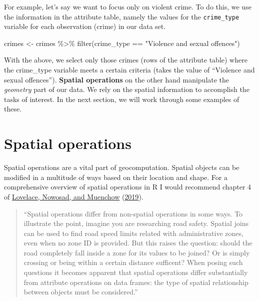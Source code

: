 \documentclass[
]{book}
\newenvironment{Shaded}{\begin{snugshade}}{\end{snugshade}}
\newcommand{\FunctionTok}[1]{\textcolor[rgb]{0.00,0.00,0.00}{#1}}
\newcommand{\NormalTok}[1]{#1}
\newcommand{\OtherTok}[1]{\textcolor[rgb]{0.56,0.35,0.01}{#1}}
\newcommand{\SpecialCharTok}[1]{\textcolor[rgb]{0.00,0.00,0.00}{#1}}
\newcommand{\StringTok}[1]{\textcolor[rgb]{0.31,0.60,0.02}{#1}}
\begin{document}
For example, let's say we want to focus only on violent crime. To do this, we use the information in the attribute table, namely the values for the \texttt{crime\_type} variable for each observation (crime) in our data set.

\begin{Shaded}
\begin{Highlighting}[]
\NormalTok{crimes }\OtherTok{\textless{}{-}}\NormalTok{ crimes }\SpecialCharTok{\%\textgreater{}\%} \FunctionTok{filter}\NormalTok{(crime\_type }\SpecialCharTok{==} \StringTok{"Violence and sexual offences"}\NormalTok{)}
\end{Highlighting}
\end{Shaded}

With the above, we select only those crimes (rows of the attribute table) where the crime\_type variable meets a certain criteria (takes the value of ``Violence and sexual offences''). \textbf{Spatial operations} on the other hand manipulate the \emph{geometry} part of our data. We rely on the spatial information to accomplish the tasks of interest. In the next section, we will work through some examples of these.

\hypertarget{spatial-operations}{%
\section{Spatial operations}\label{spatial-operations}}

Spatial operations are a vital part of geocomputation. Spatial objects can be modified in a multitude of ways based on their location and shape. For a comprehensive overview of spatial operations in R I would recommend chapter 4 of \protect\hyperlink{ref-Lovelace_2019}{Lovelace, Nowosad, and Muenchow} (\protect\hyperlink{ref-Lovelace_2019}{2019}).

\begin{quote}
``Spatial operations differ from non-spatial operations in some ways. To illustrate the point, imagine you are researching road safety. Spatial joins can be used to find road speed limits related with administrative zones, even when no zone ID is provided. But this raises the question: should the road completely fall inside a zone for its values to be joined? Or is simply crossing or being within a certain distance sufficent? When posing such questions it becomes apparent that spatial operations differ substantially from attribute operations on data frames: the type of spatial relationship between objects must be considered.''
\end{quote}
\end{document}
